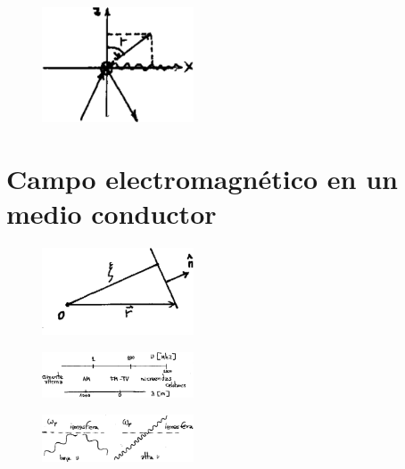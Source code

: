 \documentclass[10pt,oneside]{CBFT_book}
\begin{document}
\begin{figure}[htb]
	\begin{center}
	\includegraphics[width=0.4\textwidth]{images/fig_ft1_reflex4.pdf}	 
	\end{center}
	\caption{}
\end{figure} 

\section{Campo electromagnético en un medio conductor}

\begin{figure}[htb]
	\begin{center}
	\includegraphics[width=0.4\textwidth]{images/fig_ft1_conduc1.pdf}	 
	\end{center}
	\caption{}
\end{figure} 

\begin{figure}[htb]
	\begin{center}
	\includegraphics[width=0.4\textwidth]{images/fig_ft1_conduc2.pdf}	 
	\end{center}
	\caption{}
\end{figure} 

\begin{figure}[htb]
	\begin{center}
	\includegraphics[width=0.4\textwidth]{images/fig_ft1_conduc3.pdf}	 
	\end{center}
	\caption{}
\end{figure} 
\end{document}
